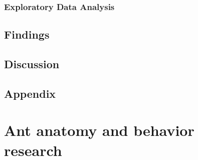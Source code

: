 \documentclass{article}
\begin{document}
	\subsubsection{Exploratory Data Analysis}
	\subsection{Findings}
	\subsection{Discussion}
	\subsection{Appendix}
	
	
	
	\section[section3]{Ant anatomy and behavior research}
	
\end{document}
